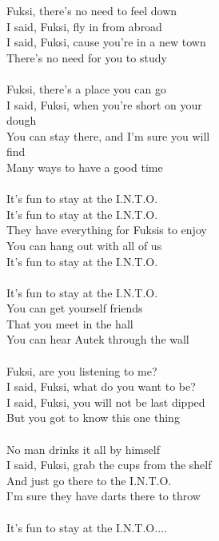 
Fuksi, there's no need to feel down \\ I said, Fuksi, fly in from abroad \\ I said, Fuksi, cause you're in a new town \\ There's no need for you to study \\ \hspace{10mm} \\ Fuksi, there's a place you can go \\ I said, Fuksi, when you're short on your \\ dough \\ You can stay there, and I'm sure you will \\ find \\ Many ways to have a good time \\ \hspace{10mm} \\ It's fun to stay at the I.N.T.O. \\ It's fun to stay at the I.N.T.O. \\ They have everything for Fuksis to enjoy \\ You can hang out with all of us \\ It's fun to stay at the I.N.T.O. \\ \hspace{10mm} \\ It's fun to stay at the I.N.T.O. \\ You can get yourself friends \\ That you meet in the hall \\ You can hear Autek through the wall \\ \hspace{10mm} \\ Fuksi, are you listening to me? \\ I said, Fuksi, what do you want to be? \\ I said, Fuksi, you will not be last dipped \\ But you got to know this one thing \\ \hspace{10mm} \\ No man drinks it all by himself \\ I said, Fuksi, grab the cups from the shelf \\ And just go there to the I.N.T.O. \\ I'm sure they have darts there to throw \\ \hspace{10mm} \\ It's fun to stay at the I.N.T.O....